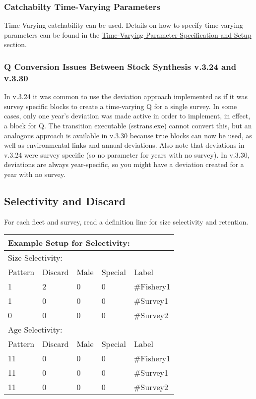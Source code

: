 \subsubsection{Catchabilty Time-Varying Parameters}
Time-Varying catchability can be used. Details on how to specify time-varying parameters can be found in the \hyperlink{tvOrder}{Time-Varying Parameter Specification and Setup} section.

\subsubsection{Q Conversion Issues Between Stock Synthesis v.3.24 and v.3.30}
In v.3.24 it was common to use the deviation approach implemented as if it was survey specific blocks to create a time-varying Q for a single survey. In some cases, only one year's deviation was made active in order to implement, in effect, a block for Q. The transition executable (sstrans.exe) cannot convert this, but an analogous approach is available in v.3.30 because true blocks can now be used, as well as environmental links and annual deviations. Also note that deviations in v.3.24 were survey specific (so no parameter for years with no survey). In v.3.30, deviations are always year-specific, so you might have a deviation created for a year with no survey.

\subsection{Selectivity and Discard}
For each fleet and survey, read a definition line for size selectivity and retention. 

\begin{center}
	\begin{longtable}{p{2cm} p{2cm} p{2cm} p{2cm} p{6.5cm}}
		\multicolumn{5}{l}{Example Setup for Selectivity:} \Tstrut\\
		\hline
		\multicolumn{5}{l}{Size Selectivity:} \Tstrut\\
		Pattern & Discard & Male & Special & Label \Bstrut\\
		\hline
		1 & 2 & 0 & 0 & \#Fishery1 \Tstrut\\
		1 & 0 & 0 & 0 & \#Survey1 \\
		0 & 0 & 0 & 0 & \#Survey2 \Bstrut\\
		\hline
		
		\multicolumn{5}{l}{Age Selectivity:} \Tstrut\\
		Pattern & Discard & Male & Special & Label \Bstrut\\
		\hline
		11 & 0 & 0 & 0 & \#Fishery1 \Tstrut\\
		11 & 0 & 0 & 0 & \#Survey1 \\
		11 & 0 & 0 & 0 & \#Survey2 \Bstrut\\
		\hline
	\end{longtable}
\end{center}

